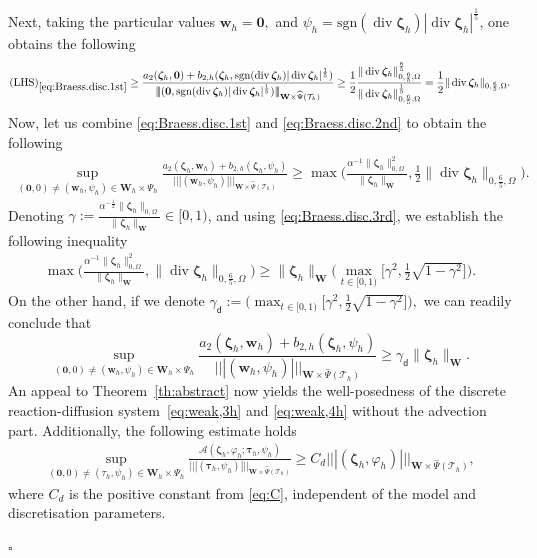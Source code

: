 \documentclass[10pt,a4paper]{amsart}
\newcommand{\bW}{\mathbf{W}}
\newcommand\btau{\boldsymbol{\tau}}
\newcommand{\bw}{\boldsymbol{w}}
\newcommand\bzero{\boldsymbol{0}}
\newcommand\bzeta{\boldsymbol{\zeta}}
\newcommand{\cA}{\mathcal{A}}
\newcommand{\cT}{\mathcal{T}}
\newenvironment{proof}{\noindent{\it Proof.}}{\hfill$\square$}
\newcommand*\tnorm[1]{|\!|\!| #1 |\!|\!|}
\newcommand\vdiv{\mathop{\mathrm{div}}\nolimits}
\begin{document}
\begin{proof}
Next, {taking the particular values} \(\bw_h=\bzero,\) and \(\psi_h=\mathrm{sgn}(\vdiv\bzeta_h)|\vdiv\bzeta_h|^{\frac15}\), %
one obtains the following 
\begin{align}\label{eq:Braess.disc.2nd}  
(\mathrm{LHS})_{\eqref{eq:Braess.disc.1st}}\geq \frac{a_2(\bzeta_h,\bzero)+b_{2,h}(\bzeta_h,\mathrm{sgn}(\vdiv\bzeta_h)|\vdiv\bzeta_h|^{\frac15})}{\tnorm{(\bzero,\mathrm{sgn}(\vdiv\bzeta_h)|\vdiv\bzeta_h|^{\frac15})}_{\bW\times\widehat{\Psi}(\cT_h)}}\geq\frac12 \frac{\|\vdiv \bzeta_h\|^{\frac65}_{0,\frac65,\Omega}}{\|\vdiv \bzeta_h\|^{\frac15}_{0,\frac65,\Omega}}=\frac12\|\vdiv \bzeta_h\|_{0,\frac65,\Omega}.
\end{align}
Now, let us combine \eqref{eq:Braess.disc.1st} and \eqref{eq:Braess.disc.2nd} to obtain the following
\begin{align}\label{eq:Braess.disc.3rd}
\sup_{(\bzero,0)\neq(\bw_h,\psi_h)\in\bW_h\times\Psi_h}\frac{a_2(\bzeta_h,\bw_h)+b_{2,h}(\bzeta_h,\psi_h)}{\tnorm{(\bw_h,\psi_h)}_{\bW\times\widehat{\Psi}(\cT_h)}}\geq\max\biggl({\frac{\alpha^{-1}\|\bzeta_h\|^2_{0,\Omega}}{\|\bzeta_h\|_{\bW}},\frac12\|\vdiv \bzeta_h\|_{0,\frac65,\Omega}}\biggr).
\end{align}
Denoting \(\gamma:=\frac{\alpha^{-\frac12}\|\bzeta_h\|_{0,\Omega}}{\|\bzeta_h\|_{\bW}}\in[0,1)\), and using \eqref{eq:Braess.disc.3rd}, we establish the following inequality
\begin{align*}\max\biggl({\frac{\alpha^{-1}\|\bzeta_h\|^2_{0,\Omega}}{\|\bzeta_h\|_{\bW}},\|\vdiv \bzeta_h\|_{0,\frac65,\Omega}}\biggr)\geq \|\bzeta_h\|_{\bW}\biggl(\max_{t\in[0,1)}\bigl[\gamma^2,\frac12\sqrt{1-\gamma^2}\bigr]\biggr). \end{align*}
On the other hand, if we  denote \(\gamma_{\mathsf{d}}:=\biggl(\max_{t\in[0,1)}\bigl[\gamma^2,\frac12\sqrt{1-\gamma^2}\bigr]\biggr),\) we can readily conclude that \[\sup_{(\bzero,0)\neq(\bw_h,\psi_h)\in\bW_h\times\Psi_h}\frac{a_2(\bzeta_h,\bw_h)+b_{2,h}(\bzeta_h,\psi_h)}{\tnorm{(\bw_h,\psi_h)}_{\bW\times\widehat{\Psi}(\cT_h)}}\geq \gamma_{\mathsf{d}} \|\bzeta_h\|_{\bW}.\]
An appeal to  Theorem~\ref{th:abstract} now yields the well-posedness of the discrete reaction-diffusion system~\eqref{eq:weak,3h} and \eqref{eq:weak,4h} without the advection part. Additionally, the following estimate holds 
\begin{align}\label{eq:A.stab.disc}
\sup_{(\bzero,0)\neq(\tau_h,\psi_h)\in\bW_h\times\Psi_h}\frac{\cA(\bzeta_h,\varphi_h;\btau_h,\psi_h)}{\tnorm{(\btau_h,\psi_h)}_{\bW\times \widehat{\Psi}(\cT_h)}}\geq C_d\tnorm{(\bzeta_h,\varphi_h)}_{\bW\times \widehat{\Psi}(\cT_h)},
\end{align}
where \(C_d\) is the positive constant from 
\eqref{eq:C},   independent of the model and   discretisation parameters.


\end{proof}
\end{document}
